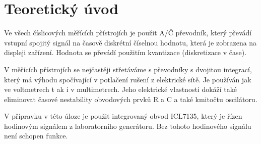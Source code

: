 \documentclass[a4paper, czech]{article}
\begin{document}
\section{Teoretický úvod}

Ve všech číslicových měřících přístrojích je použit A/Č převodník, který převádí vstupní spojitý signál na časově diskrétní číselnou hodnotu, která je zobrazena na displeji zařízení.
Hodnota se převádí použitím kvantizace (diskretizace v čase).

V měřících přístrojích se nejčastěji střetáváme s převodníky s dvojitou integrací, který má výhodu spočívající v potlačení rušení z elektrické sítě.
Je používán jak ve voltmetrech t ak i v multimetrech.
Jeho elektrické vlastnosti dokáží také eliminovat časové nestability obvodových prvků R a C a také kmitočtu oscilátoru.

V přípravku v této úloze je použit integrovaný obvod ICL7135, který je řízen hodinovým signálem z laboratorního generátoru.
Bez tohoto hodinového signálu není schopen funkce.
\end{document}

